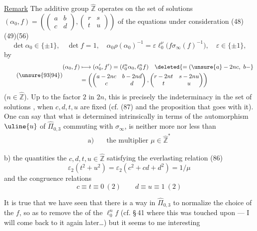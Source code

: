 \uline{Remark} The additive group $\widehat{\mathbb Z}$ operates on the set
of solutions
$(\alpha_0,f)=\left(\begin{pmatrix}a&b\\c&d\end{pmatrix},
\begin{pmatrix}r&s\\t&u\end{pmatrix}\right)$
of the equations under consideration (48)(49)(56)
\[
\tag{93}
\det\alpha_0\in\{\pm1\},\quad\det f=1,\quad
\alpha_0\rho(\alpha_0)^{-1}
=\varepsilon\ell_0^{\nu}\bigl(f\sigma_\infty(f)^{-1}\bigr),
\quad\varepsilon\in\{\pm1\},
\]
by
\[
\tag{\unsure{93|94}}
\begin{aligned}
(\alpha_0,f)&\longmapsto(\alpha'_0,f')
=(\ell_0^n\alpha_0,\ell_0^nf)\quad\deleted{=(\unsure{a}-2nc,\ b-}\\
&=\left(\begin{pmatrix}a-2nc&b-2nd\\c&d\end{pmatrix},
\begin{pmatrix}r-2nt&s-2nu\\t&u\end{pmatrix}\right)
\end{aligned}
\]
($n\in\widehat{\mathbb Z}$).
Up to the factor $2$ in $2n$, this is precisely the indeterminacy in
 the set of solutions , when
$c,d,t,u$ are fixed (cf. (87) and the proposition that goes with it).
One can  say that what is determined
intrinsically 
in terms of the  automorphism $\uline{u}$ of
$\widehat{\Pi}_{0,3}$ commuting with $\sigma_\infty$, is neither more nor less
than 
\[
\tag{95}
\begin{aligned}
\text{a)}\quad&\text{the multiplier }\mu\in\widehat{\mathbb Z}^{*}
\end{aligned}
\]

b) the quantities
the $c,d,t,u\in\widehat{\mathbb Z}$ satisfying the
everlasting relation (86)
\[
\tag{96}
\varepsilon_2(t^2+u^2)=\varepsilon_2(c^2+cd+d^2)=1/\mu
\]
and the congruence relations
\[
\tag{97}
c\equiv t\equiv0\ (2)\qquad d\equiv u\equiv1\ (2)
\]

It is true that we have seen that there is a  way in
$\widehat{\Pi}_{0,3}$ to normalize the choice of the $f$, so as to remove
the  of the $\ell_0^nf$
(cf. \S\,41 \inserted{(24bis)} where this was touched upon --- I will come back to it
again later\ldots) but it seems to me \inserted{\uline{not very}}
interesting

\margin{167}